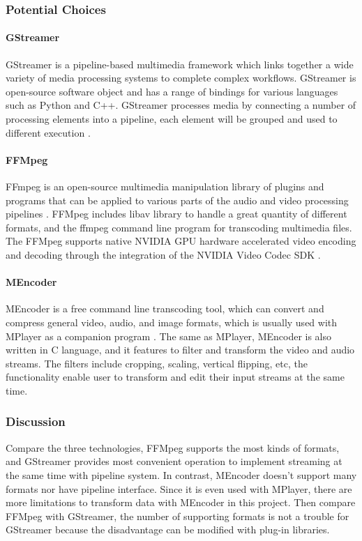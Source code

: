 \subsubsection{Potential Choices}
\paragraph{GStreamer}
GStreamer is a pipeline-based multimedia framework which links together a wide variety of media processing systems to complete complex workflows. GStreamer is open-source software object and has
 a range of bindings for various languages such as Python and C++. GStreamer processes media
  by connecting a number of processing elements into a pipeline, each element will be grouped and 
  used to different execution \cite{gstreamer}.\\

\paragraph{FFMpeg}
FFmpeg is an open-source multimedia manipulation library of plugins and programs that can be applied to 
various parts of the audio and video processing pipelines \cite{ffmpeg}. FFMpeg includes libav library 
to handle a great quantity of different formats, and the ffmpeg command line program for transcoding 
multimedia files. The FFMpeg supports native NVIDIA GPU hardware accelerated video encoding and decoding 
through the integration of the NVIDIA Video Codec SDK \cite{nvidia}.\\

\paragraph{MEncoder}
MEncoder is a free command line transcoding tool, which can convert and compress general video, audio, 
and image formats, which is usually used with MPlayer as a companion program \cite{mplay}. The same as MPlayer, 
MEncoder is also written in C language, and it features to filter and transform the video and audio 
streams. The filters include cropping, scaling, vertical flipping, etc, the functionality enable user to 
transform and edit their input streams at the same time.\\

\subsubsection{Discussion}
Compare the three technologies, FFMpeg supports the most kinds of formats, and GStreamer provides most 
convenient operation to implement streaming at the same time with pipeline system. In contrast, MEncoder 
doesn’t support many formats nor have pipeline interface. Since it is even used with MPlayer, there are 
more limitations to transform data with MEncoder in this project. Then compare FFMpeg with GStreamer, the 
number of supporting formats is not a trouble for GStreamer because the disadvantage can be modified with 
plug-in libraries.\\

